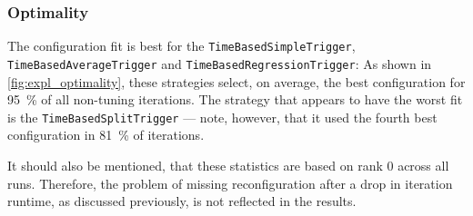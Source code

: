 \subsubsection{Optimality}
The configuration fit is best for the \texttt{TimeBasedSimpleTrigger}, \texttt{TimeBasedAverageTrigger} and \texttt{TimeBasedRegressionTrigger}: As shown in \autoref{fig:expl_optimality}, these strategies select, on average, the best configuration for \qty{95}{\percent} of all non-tuning iterations. The strategy that appears to have the worst fit is the \texttt{TimeBasedSplitTrigger} --- note, however, that it used the fourth best configuration in \qty{81}{\percent} of iterations.

It should also be mentioned, that these statistics are based on rank 0 across all runs. Therefore, the problem of missing reconfiguration after a drop in iteration runtime, as discussed previously, is not reflected in the results.

